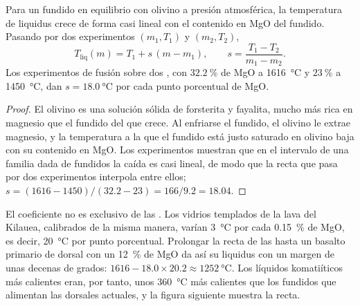 \begin{proposition}\label{prop:b2:precambrian-earth:liquidus}
Para un fundido en equilibrio con olivino a presión atmosférica, la temperatura de liquidus crece
de forma casi lineal con el contenido en MgO del fundido. Pasando por dos experimentos $(m_1, T_1)$ y
$(m_2, T_2)$,
\[
  T_{\text{liq}}(m) = T_1 + s\,(m - m_1), \qquad s = \frac{T_1 - T_2}{m_1 - m_2} .
\]
Los experimentos de fusión sobre dos , con $\qty{32.2}{\percent}$ de MgO a \qty{1616}{\celsius} y
$\qty{23}{\percent}$ a \qty{1450}{\celsius}, dan $s = \qty{18.0}{\celsius}$ por cada punto porcentual de
MgO.
\end{proposition}

\begin{proof}
El olivino es una solución sólida de forsterita y fayalita, mucho más rica en magnesio que el fundido
del que crece. Al enfriarse el fundido, el olivino le extrae magnesio, y la temperatura a
la que el fundido está justo saturado en olivino baja con su contenido en MgO. Los experimentos muestran que
en el intervalo de una familia dada de fundidos la caída es casi lineal, de modo que la recta que pasa por
dos experimentos interpola entre ellos; $s = (1616 - 1450)/(32.2 - 23) = 166/9.2 = 18.04$.
\end{proof}

El coeficiente no es exclusivo de las . Los vidrios templados de la lava del Kilauea,
calibrados de la misma manera, varían \qty{3}{\celsius} por cada \qty{0.15}{\percent} de MgO, es
decir, \qty{20}{\celsius} por punto porcentual. Prolongar la recta de las  hasta un basalto primario de dorsal
con un \qty{12}{\percent} de MgO da así su liquidus con un margen de unas decenas de grados: $1616 -
18.0\times20.2 \approx \qty{1252}{\celsius}$. Los líquidos komatiíticos más calientes eran, por tanto,
unos \qty{360}{\celsius} más calientes que los fundidos que alimentan las dorsales actuales, y la figura siguiente
muestra la recta.

